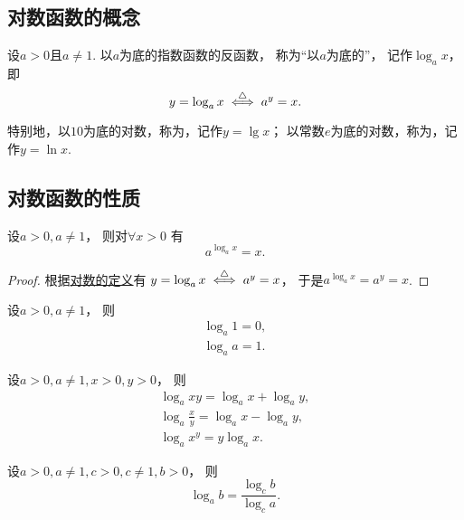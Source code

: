 \subsection{对数函数的概念}
\begin{definition}
设\(a>0\)且\(a\neq1\).
以\(a\)为底的指数函数的反函数，
称为“以\(a\)为底的”，
记作\(\log_a x\)，
即\begin{equation}\label{equation:函数.对数的定义}
	y = \log_a x
	\overset{\triangle}{\iff}
	a^y = x.
\end{equation}

特别地，以\(10\)为底的对数，称为，记作\(y = \lg x\)；
以常数\(e\)为底的对数，称为，记作\(y = \ln x\).
\end{definition}

\subsection{对数函数的性质}
\begin{proposition}[对数恒等式]
设\(a>0,a\neq1\)，
则对\(\forall x>0\)
有\begin{equation}\label{equation:函数.对数恒等式}
	a^{\log_a x} = x.
\end{equation}
\begin{proof}
根据\hyperref[equation:函数.对数的定义]{对数的定义}有
\(y = \log_a x
\overset{\triangle}{\iff}
a^y = x\)，
于是\(a^{\log_a x} = a^y = x\).
\end{proof}
\end{proposition}

\begin{theorem}
设\(a>0,a\neq1\)，
则\begin{gather}
	\log_a 1 = 0, \\
	\log_a a = 1.
\end{gather}
\end{theorem}

\begin{theorem}
设\(a>0,a\neq1,x>0,y>0\)，
则\begin{gather}
	\log_a xy = \log_a x + \log_a y, \\
	\log_a \frac{x}{y} = \log_a x - \log_a y, \\
	\log_a x^y = y \log_a x.
\end{gather}
\end{theorem}

\begin{theorem}[换底公式]
设\(a>0,a\neq1,c>0,c\neq1,b>0\)，
则\begin{equation}\label{equation:函数.换底公式}
	\log_a b = \frac{\log_c b}{\log_c a}.
\end{equation}
\end{theorem}

